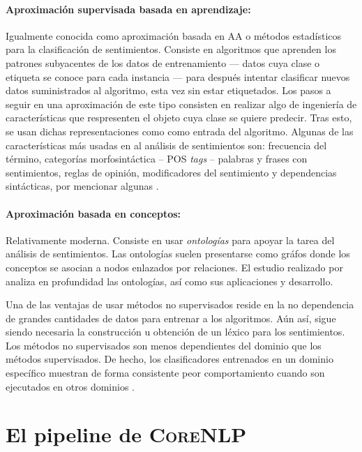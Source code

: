 \paragraph{Aproximación supervisada basada en aprendizaje:}Igualmente conocida
como aproximación basada en \ac{AA} o métodos estadísticos para la clasificación
de sentimientos. Consiste en algoritmos que aprenden los patrones subyacentes de
los datos de entrenamiento --- datos cuya clase o etiqueta se conoce para cada
instancia --- para después intentar clasificar nuevos datos suministrados al
algoritmo, esta vez sin estar etiquetados. Los pasos a seguir en una
aproximación de este tipo consisten en realizar algo de ingeniería de
características que respresenten el objeto cuya clase se quiere predecir. Tras
esto, se usan dichas representaciones como como entrada del algoritmo. Algunas
de las características más usadas en al análisis de sentimientos son: frecuencia
del término, categorías morfosintáctica -- \ac{POS} \emph{tags} -- palabras y
frases con sentimientos, reglas de opinión,  modificadores del sentimiento y
dependencias sintácticas, por mencionar algunas \cite{Liu2012}.


\paragraph{Aproximación basada en conceptos:}Relativamente moderna. Consiste en
usar \emph{ontologías} para apoyar la tarea del
análisis de sentimientos. Las ontologías suelen presentarse como gráfos donde
los conceptos se asocian a nodos enlazados por relaciones. El estudio realizado
por \citet{Zhou2007} analiza en profundidad las ontologías, así como sus
aplicaciones y desarrollo.

Una de las ventajas de usar métodos no supervisados reside en la no dependencia
de grandes cantidades de datos para entrenar a los algoritmos. Aún así, sigue
siendo necesaria la construcción u obtención de un léxico para los
sentimientos. Los métodos no supervisados son menos dependientes del dominio que
los métodos supervisados. De hecho, los clasificadores entrenados en un dominio
específico muestran de forma consistente peor comportamiento cuando son
ejecutados en otros dominios \cite{anthony2005}.


\section{El pipeline de \textsc{CoreNLP}}
\label{sec:corenlppipeline}

